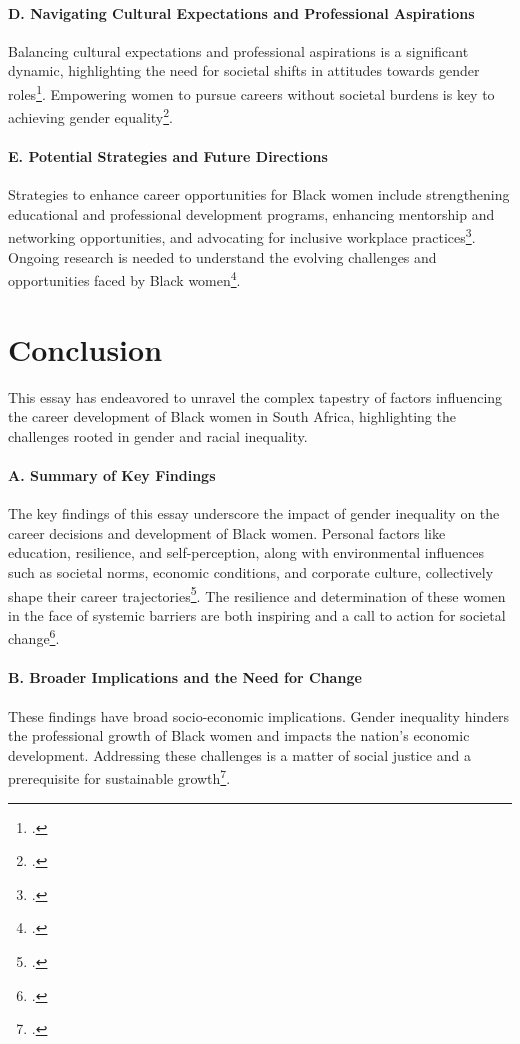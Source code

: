 \documentclass{article}
\begin{document}
\paragraph{D. Navigating Cultural Expectations and Professional Aspirations}
Balancing cultural expectations and professional aspirations is a significant dynamic, highlighting the need for societal shifts in attitudes towards gender roles\footcite{fenyes2000casualization}. Empowering women to pursue careers without societal burdens is key to achieving gender equality\footcite{gradin2018occupational}.

\paragraph{E. Potential Strategies and Future Directions}
Strategies to enhance career opportunities for Black women include strengthening educational and professional development programs, enhancing mentorship and networking opportunities, and advocating for inclusive workplace practices\footcite{francis2022black}. Ongoing research is needed to understand the evolving challenges and opportunities faced by Black women\footcite{matotoka2018transformative}.

\newpage
\section{Conclusion}

This essay has endeavored to unravel the complex tapestry of factors influencing the career development of Black women in South Africa, highlighting the challenges rooted in gender and racial inequality.

\paragraph{A. Summary of Key Findings}
The key findings of this essay underscore the impact of gender inequality on the career decisions and development of Black women. Personal factors like education, resilience, and self-perception, along with environmental influences such as societal norms, economic conditions, and corporate culture, collectively shape their career trajectories\footcite{jaga2018doing}. The resilience and determination of these women in the face of systemic barriers are both inspiring and a call to action for societal change\footcite{matotoka2018transformative}.

\paragraph{B. Broader Implications and the Need for Change}
These findings have broad socio-economic implications. Gender inequality hinders the professional growth of Black women and impacts the nation's economic development. Addressing these challenges is a matter of social justice and a prerequisite for sustainable growth\footcite{monnapula-mapesela2017developing}.
\end{document}
